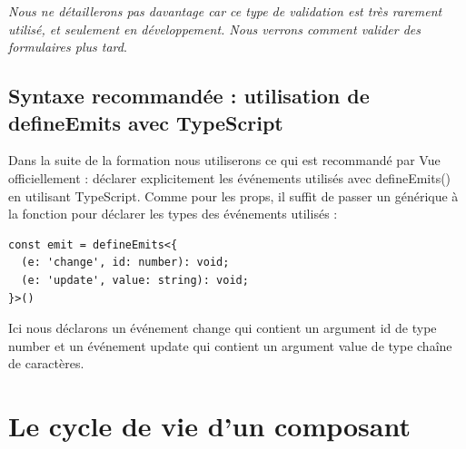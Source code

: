 \documentclass{article}
\begin{document}
{\em Nous ne détaillerons pas davantage car ce type de validation est très rarement utilisé, et seulement en développement. Nous verrons comment valider des formulaires plus tard}.

\subsection{Syntaxe recommandée : utilisation de {\color{monOrange}defineEmits} avec {\color{monOrange}TypeScript}}
Dans la suite de la formation nous utiliserons ce qui est recommandé par {\color{monOrange}Vue} officiellement : déclarer explicitement les événements utilisés avec {\color{monOrange}defineEmits()} en utilisant {\color{monOrange}TypeScript}. Comme pour les {\color{monOrange}props}, il suffit de passer un générique à la fonction pour déclarer les types des événements utilisés :
\begin{verbatim}
const emit = defineEmits<{
  (e: 'change', id: number): void;
  (e: 'update', value: string): void;
}>()
\end{verbatim}

Ici nous déclarons un événement {\color{monOrange}change} qui contient un argument {\color{monOrange}id} de type {\color{monOrange}number} et un événement {\color{monOrange}update} qui contient un argument {\color{monOrange}value} de type chaîne de caractères.



\section{Le cycle de vie d'un composant}
\end{document}
